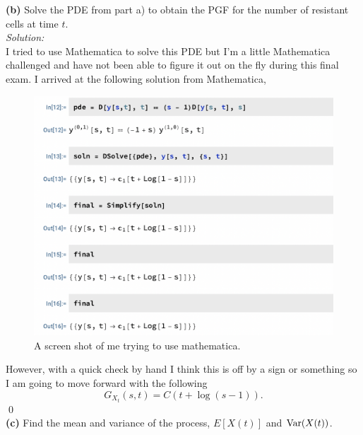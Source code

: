 \documentclass[10pt]{amsart}
\begin{document}
\noindent
{\bf (b)} Solve the PDE from part a) to obtain the PGF for the number of resistant cells at time $t$. \\

\noindent
\textit{Solution:} \\
I tried to use Mathematica to solve this PDE but I'm a little Mathematica challenged and have not been able to figure it out on the fly during this final exam.
I arrived at the following solution from Mathematica,
\begin{figure}[h]
	\centering
	\includegraphics[scale=0.25]{mathematica.png}
	\caption{
		A screen shot of me trying to use mathematica.
	}\label{fig:f1}
\end{figure}
However, with a quick check by hand I think this is off by a sign or something so I am going to move forward with the following
$$
G_{X_t}(s,t) = C(t + \log(s - 1)).
$$
\qed \\

\noindent
{\bf (c)} Find the mean and variance of the process, $E[X(t)]$ and ${\rm Var}(X(t))$. \\
\end{document}
